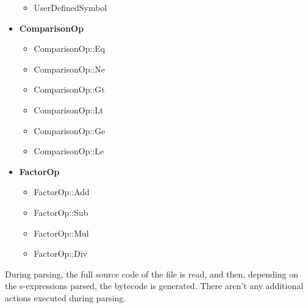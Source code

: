\documentclass[11pt]{scrreprt}
\begin{document}
\begin{itemize}
\begin{itemize}
    \item UserDefinedSymbol
  \end{itemize}
  \item \textbf{ComparisonOp}
  \begin{itemize}
    \item ComparisonOp::Eq
    \item ComparisonOp::Ne
    \item ComparisonOp::Gt
    \item ComparisonOp::Lt
    \item ComparisonOp::Ge
    \item ComparisonOp::Le
  \end{itemize}
  \item \textbf{FactorOp}
  \begin{itemize}
    \item FactorOp::Add
    \item FactorOp::Sub
    \item FactorOp::Mul
    \item FactorOp::Div
  \end{itemize}
\end{itemize}

During parsing, the full source code of the file is read, and then, depending on the s-expressions parsed, the bytecode is generated. There aren't any additional actions executed during parsing.
\end{document}
